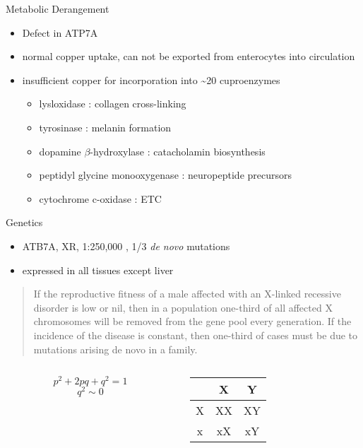 \documentclass[presentation, smaller]{beamer}
\begin{document}
\begin{frame}[label={sec:org1ff563b}]{Metabolic Derangement}
\begin{itemize}
\item Defect in ATP7A
\item normal copper uptake, can not be exported from enterocytes into circulation
\item insufficient copper for incorporation into \textasciitilde{}20 cuproenzymes
\begin{itemize}
\item lysloxidase : collagen cross-linking
\item tyrosinase : melanin formation
\item dopamine \(\beta\)-hydroxylase : catacholamin biosynthesis
\item peptidyl glycine monooxygenase : neuropeptide precursors
\item cytochrome c-oxidase : ETC
\end{itemize}
\end{itemize}
\end{frame}

\begin{frame}[label={sec:org3c7fe19}]{Genetics}
\begin{itemize}
\item ATB7A, XR, 1:250,000 , 1/3 \emph{de novo} mutations
\item expressed in all tissues except liver
\end{itemize}

\begin{quotation} %
If the reproductive fitness of a male affected with an X-linked
recessive disorder is low or nil, then in a population \alert{one-third of}
\alert{all affected X chromosomes will be removed from the gene pool every
generation}. If the incidence of the disease is constant, then
one-third of cases must be due to mutations arising de novo in a
family.
\end{quotation}

\begin{columns}
\begin{column}{0.5\columnwidth}
\[
p^2 + 2pq + q^2 = 1 
\]
\[
q^2 \sim 0
\]
\end{column}

\begin{column}{0.5\columnwidth}
\begin{center}
\begin{tabular}{|c|c|c|}
 & X & Y\\
\hline
X & XX & XY\\
\hline
x & xX & \alert{xY}\\
\end{tabular}
\end{center}
\end{column}
\end{columns}
\end{frame}
\end{document}
